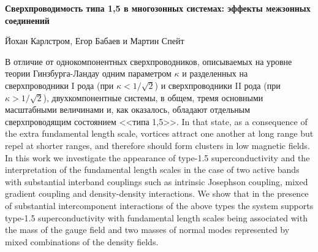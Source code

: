 \documentclass[notitlepage,12pt,a4paper]{report}
\begin{document}
  
  \begin{center}
    \textbf{Сверхпроводимость типа 1,5 в многозонных системах: эффекты межзонных
      соединений}

    Йохан Карлстром, Егор Бабаев и Мартин Спейт
    
    \bigskip
    \begin{minipage}{.9\textwidth}
      \flushleft
      В отличие от однокомпонентных сверхпроводников, описываемых на уровне
      теории Гинзбурга-Ландау одним параметром \( \kappa \) и разделенных на
      сверхпроводники I рода (при \( \kappa < 1/\sqrt{2} \)) и сверхпроводники
      II рода (при \( \kappa > 1/\sqrt{2} \)), двухкомпонентные системы, в
      общем, тремя основными масштабными величинами и, как оказалось, обладают
      отдельным сверхпроводящим состоянием <<типа 1,5>>\cite{bib:1,bib:2}.
      In that state, as a consequence of the extra fundamental length scale,
      vortices attract one another at long range but repel at shorter ranges,
      and therefore should form clusters in low magnetic fields. In this work
      we investigate the appearance of type-1.5 superconductivity and the
      interpretation of the fundamental length scales in the case of two active
      bands with substantial interband couplings such as intrinsic Josephson
      coupling, mixed gradient coupling and density-density interactions. We
      show that in the presence of substantial intercomponent interactions of
      the above types the system supports type-1.5 superconductivity with
      fundamental length scales being associated with the mass of the gauge
      field and two masses of normal modes represented by mixed combinations of
      the density fields.
    \end{minipage}
  \end{center}
  
   \newpage
   \newpage
   \newpage
   \newpage
   \newpage
  \begin{appendix}
     \newpage
     \newpage
     \newpage
  \end{appendix}
  
\end{document}
